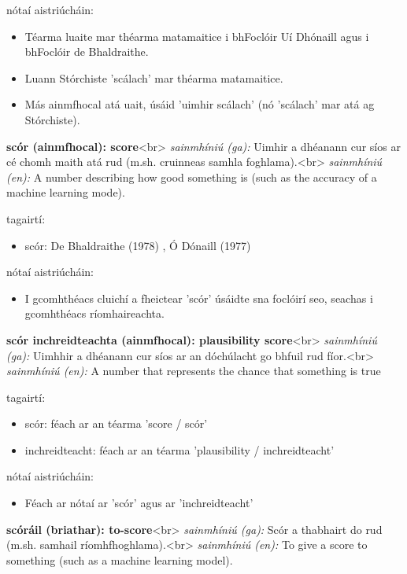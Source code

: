 \documentclass{article}
\begin{document}
nótaí aistriúcháin:
\begin{itemize}
	\item Téarma luaite mar théarma matamaitice i bhFoclóir Uí Dhónaill agus i bhFoclóir de Bhaldraithe.
	\item Luann Stórchiste 'scálach' mar théarma matamaitice.
	\item Más ainmfhocal atá uait, úsáid 'uimhir scálach' (nó 'scálach' mar atá ag Stórchiste).
\end{itemize}


\textbf{scór (ainmfhocal): score}<br>
\textit{sainmhíniú (ga):} Uimhir a dhéanann cur síos ar cé chomh maith atá rud (m.sh. cruinneas samhla foghlama).<br>
\textit{sainmhíniú (en):} A number describing how good something is (such as the accuracy of a machine learning mode).

tagairtí:
\begin{itemize}
	\item scór: De Bhaldraithe (1978) \cite{de-bhaldraithe}, Ó Dónaill (1977) \cite{odonaill}
\end{itemize}

nótaí aistriúcháin:
\begin{itemize}
	\item I gcomhthéacs cluichí a fheictear 'scór' úsáidte sna foclóirí seo, seachas i gcomhthéacs ríomhaireachta.
\end{itemize}


\textbf{scór inchreidteachta (ainmfhocal): plausibility score}<br>
\textit{sainmhíniú (ga):} Uimhhir a dhéanann cur síos ar an dóchúlacht go bhfuil rud fíor.<br>
\textit{sainmhíniú (en):} A number that represents the chance that something is true

tagairtí:
\begin{itemize}
	\item scór: féach ar an téarma 'score / scór'
	\item inchreidteacht: féach ar an téarma 'plausibility / inchreidteacht'
\end{itemize}

nótaí aistriúcháin:
\begin{itemize}
	\item Féach ar nótaí ar 'scór' agus ar 'inchreidteacht'
\end{itemize}


\textbf{scóráil (briathar): to-score}<br>
\textit{sainmhíniú (ga):} Scór a thabhairt do rud (m.sh. samhail ríomhfhoghlama).<br>
\textit{sainmhíniú (en):} To give a score to something (such as a machine learning model).
\end{document}
